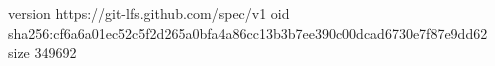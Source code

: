 version https://git-lfs.github.com/spec/v1
oid sha256:cf6a6a01ec52c5f2d265a0bfa4a86cc13b3b7ee390c00dcad6730e7f87e9dd62
size 349692
